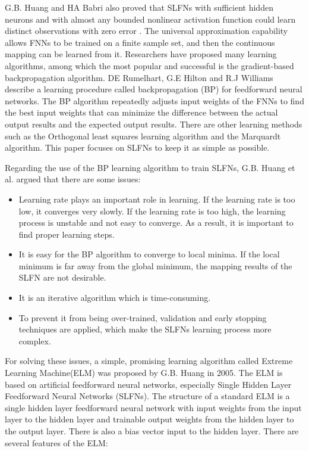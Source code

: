 \documentclass[a4paper, 14pt]{extarticle}
\begin{document}
G.B. Huang and HA Babri also proved that SLFNs with sufficient hidden neurons and with almost any bounded nonlinear activation function could learn distinct observations with zero error\cite{655045} \cite{G.B.Huang-ICNN}. The universal approximation capability allows FNNs to be trained on a finite sample set, and then the continuous mapping can be learned from it\cite{HORNIK1991251}. Researchers have proposed many learning algorithms, among which the most popular and successful is the gradient-based backpropagation algorithm. DE Rumelhart, G.E Hilton and R.J Williams describe a learning procedure called backpropagation (BP) for feedforward neural networks. The BP algorithm repeatedly adjusts input weights of the FNNs to find the best input weights that can minimize the difference between the actual output results and the expected output results\cite{rumelhart1988learning}. There are other learning methods such as the Orthogonal least squares learning algorithm\cite{Chen1991OrthogonalLS} and the Marquardt algorithm\cite{hagan1994training}. This paper focuses on SLFNs to keep it as simple as possible.
\par Regarding the use of the BP learning algorithm to train SLFNs, G.B. Huang et al. argued that there are some issues\cite{G.B.Huang-ICNN}\cite{6035797}\cite{huang2006extreme}: \begin{itemize}
    \item Learning rate plays an important role in learning. If the learning rate is too low, it converges very slowly. If the learning rate is too high, the learning process is unstable and not easy to converge. As a result, it is important to find proper learning steps. 
    \item It is easy for the BP algorithm to converge to local minima. If the local minimum is far away from the global minimum, the mapping results of the SLFN are not desirable.
    \item It is an iterative algorithm which is time-consuming.
    \item To prevent it from being over-trained, validation and early stopping techniques are applied, which make the SLFNs learning process more complex. 
\end{itemize} 
For solving these issues, a simple, promising learning algorithm called Extreme Learning Machine(ELM) was proposed by G.B. Huang in 2005. The ELM is based on artificial feedforward neural networks, especially Single Hidden Layer Feedforward Neural Networks (SLFNs). The structure of a standard ELM is a single hidden layer feedforward neural network with input weights from the input layer to the hidden layer and trainable output weights from the hidden layer to the output layer. There is also a bias vector input to the hidden layer. There are several features of the ELM\cite{huang2015extreme}: 
\end{document}
